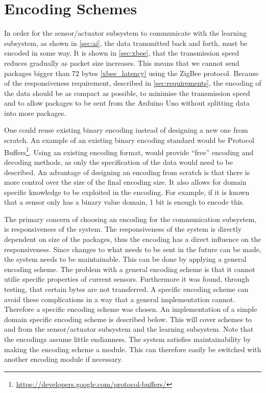 \section{Encoding Schemes}
\label{sec:encoding}
In order for the sensor/actuator subsystem to communicate with the learning subsystem, as shown in \cref{sec:ai}, the data transmitted back and forth, must be encoded in some way. It is shown in \cref{sec:xbee}, that the transmission speed reduces gradually as packet size increases. This means that we cannot send packages bigger than 72 bytes \cref{xbee_latency} using the ZigBee protocol. Because of the responsiveness requirement, described in \cref{sec:requirements}, the encoding of the data should be as compact as possible, to minimise the transmission speed and to allow packages to be sent from the Arduino Uno without splitting data into more packages.

One could reuse existing binary encoding instead of designing a new one from scratch. An example of an existing binary encoding standard would be Protocol Buffers\footnote{\url{https://developers.google.com/protocol-buffers/}}. Using an existing encoding format, would provide \enquote{free} encoding and decoding methods, as only the specification of the data would need to be described. An advantage of designing an encoding from scratch is that there is more control over the size of the final encoding size. It also allows for domain specific knowledge to be exploited in the encoding. For example, if it is known that a sensor only has a binary value domain, 1 bit is enough to encode this.

The primary concern of choosing an encoding for the communication subsystem, is responsiveness of the system.
The responsiveness of the system is directly dependent on size of the packages, thus the encoding has a direct influence on the responsiveness. Since changes to what needs to be sent in the future can be made, the system needs to be maintainable. This can be done by applying a general encoding scheme. The problem with a general encoding scheme is that it cannot utilie specific properties of current sensors. Furthermore it was found, through testing, that certain bytes are not transferred. A specific encoding scheme can avoid these complications in a way that a general implementation cannot. Therefore a specific encoding scheme was chosen. An implementation of a simple domain specific encoding scheme is described below. This will cover schemes to and from the sensor/actuator subsystem and the learning subsystem. Note that the encodings assume little endianness. The system satisfies maintainability by making the encoding scheme a module. This can therefore easily be switched with another encoding module if necessary.


